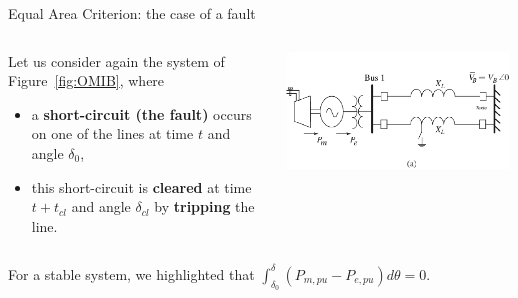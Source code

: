 \begin{frame}[allowframebreaks]{Equal Area Criterion: the case of a fault}
\begin{columns}
    \begin{column}{0.55\textwidth}
        Let us consider again the system of Figure~\ref{fig:OMIB}, where 
        \begin{itemize} 
            \item a \textbf{short-circuit (the fault)} occurs on one of the lines at time $t$ and angle $\delta_0$,
            \item this short-circuit is \textbf{cleared} at time $t+t_{cl}$ and angle $\delta_{cl}$ by \textbf{tripping} the line.
        \end{itemize}
    \end{column}
    \begin{column}{0.45\textwidth}
        \begin{center}
        \includegraphics[width=0.99\textwidth]{images/TransientStabilityEAC_1.png}
        \end{center}
    \end{column}
\end{columns}

For a stable system, we highlighted that $\int_{\delta_0}^{\delta} \left(P_{m,pu}-P_{e,pu}\right) d\theta = 0$.


\end{frame}
